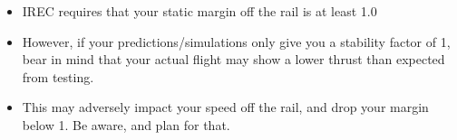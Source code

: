 \begin{itemize}
\item IREC requires that your static margin off the rail is at least 1.0
\item However, if your predictions/simulations only give you a stability factor of 1, bear in mind that your actual flight may show a lower thrust than expected from testing.
\item This may adversely impact your speed off the rail, and drop your margin below 1. Be aware, and plan for that.
\end{itemize}
